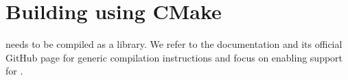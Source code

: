 \section{Building \quda using CMake}
\label{sec:building:quda}

\Quda needs to be compiled as a library. We refer to the \quda documentation \cite{QUDApaper} and its official GitHub page \cite{github:quda} for generic compilation instructions and focus on enabling support for \openqxd.








